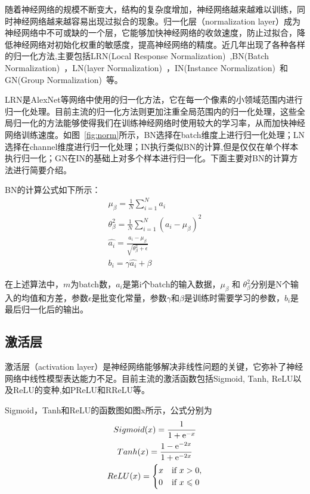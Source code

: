 随着神经网络的规模不断变大，结构的复杂度增加，神经网络越来越难以训练，同时神经网络越来越容易出现过拟合的现象。归一化层（normalization layer）成为神经网络中不可或缺的一个层，它能够加快神经网络的收敛速度，防止过拟合，降低神经网络对初始化权重的敏感度，提高神经网络的精度。近几年出现了各种各样的归一化方法,主要包括LRN(Local Response Normalization)~\cite{krizhevsky2012imagenet},BN(Batch Normalization)~\cite{ioffe2015batch}，LN(layer Normalization)~\cite{ba2016layer}，IN(Instance Normalization)~\cite{dmitry2016instance}和GN(Group Normalization)~\cite{wu2018group}等。

LRN是AlexNet等网络中使用的归一化方法，它在每一个像素的小领域范围内进行归一化处理。目前主流的归一化方法则更加注重全局范围内的归一化处理，这些全局归一化的方法能够使得我们在训练神经网络时使用较大的学习率，从而加快神经网络训练速度。如图~\ref{fig:norm}所示，BN选择在batch维度上进行归一化处理；LN选择在channel维度进行归一化处理；IN执行类似BN的计算,但是仅仅在单个样本执行归一化；GN在IN的基础上对多个样本进行归一化。下面主要对BN的计算方法进行简要介绍。

BN的计算公式如下所示：
\begin{gather}
\mu _{\beta} = \frac{1}{N} \sum_{i=1}^{N} a_i \\
\theta _{\beta}^{2} = \frac{1}{N} \sum_{i=1}^{N}(a_i - \mu _{\beta})^{2} \\
\hat{a_i}=\frac{a_i - \mu _{\beta}}{\sqrt{\theta _{\beta}^2 + \epsilon}} \\
b_i = \gamma \hat{a_i} + \beta
\end{gather}

在上述算法中，$m$为batch数，$a_i$是第i个batch的输入数据，$\mu _{\beta}$ 和 $\theta _{\beta}^{2}$分别是N个输入的均值和方差，参数$\epsilon$是批变化常量，参数$\gamma$和$\beta$是训练时需要学习的参数，$b_i$是最后归一化后的输出。

\subsection{激活层}
激活层（activation layer）是神经网络能够解决非线性问题的关键，它弥补了神经网络中线性模型表达能力不足。目前主流的激活函数包括Sigmoid, Tanh, ReLU以及ReLU的变种,如PReLU和RReLU等。

Sigmoid，Tanh和ReLU的函数图如图x所示，公式分别为
\begin{gather}
Sigmoid(x) = \frac{1}{1 + \mathrm{e}^{-x}} \\
Tanh(x) = \frac{1-\mathrm{e}^{-2x}}{1+\mathrm{e}^{-2x}} \\
ReLU(x)=
\begin{cases}
x & \text{if } x > 0, \\
0 & \text{if } x \leqslant 0
\end{cases}
\end{gather}

